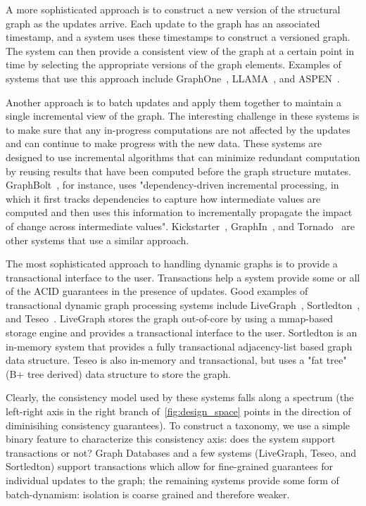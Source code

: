 A more sophisticated approach is to construct a new version of the structural graph as the updates arrive.
Each update to the graph has an associated timestamp, and a system uses these timestamps to construct a versioned graph.
The system can then provide a consistent view of the graph at a certain point in time by selecting the appropriate versions of the graph elements.
Examples of systems that use this approach include GraphOne~\cite{graphone2019kumar}, LLAMA~\cite{llama}, and ASPEN~\cite{10.1145/3314221.3314598}. 

Another approach is to batch updates and apply them together to maintain a single incremental view of the graph.
The interesting challenge in these systems is to make sure that any in-progress computations are not affected by the updates and can continue to make progress with the new data.
These systems are designed to use incremental algorithms that can minimize redundant computation by reusing results that have been computed before the graph structure mutates.
GraphBolt~\cite{mariappan2019graphbolt}, for instance, uses "dependency-driven incremental processing, in which it first tracks dependencies to capture how intermediate values are computed and then uses this information to incrementally propagate the impact of change across intermediate values".
Kickstarter~\cite{vora2017kickstarter}, GraphIn~\cite{sengupta2016graphin}, and Tornado~\cite{shi2016tornado} are other systems that use a similar approach.

The most sophisticated approach to handling dynamic graphs is to provide a transactional interface to the user.
Transactions help a system provide some or all of the ACID guarantees in the presence of updates.
Good examples of transactional dynamic graph processing systems include LiveGraph~\cite{zhu2019livegraph}, Sortledton~\cite{sortledton2022Fuchs}, and Teseo~\cite{teseo2021deLeo}.
LiveGraph stores the graph out-of-core by using a mmap-based storage engine and provides a transactional interface to the user.
Sortledton is an in-memory system that provides a fully transactional adjacency-list based graph data structure.
Teseo is also in-memory and transactional, but uses a "fat tree" (B+ tree derived) data structure to store the graph.

Clearly, the consistency model used by these systems falls along a spectrum (the left-right axis in the right branch of~\autoref{fig:design_space} points in the direction of diminisihing consistency guarantees).
To construct a taxonomy, we use a simple binary feature to characterize this consistency axis: does the system support transactions or not?
Graph Databases and a few systems (LiveGraph, Teseo, and Sortledton) support transactions which allow for fine-grained guarantees for individual updates to the graph; the remaining systems provide some form of batch-dynamism: isolation is coarse grained and therefore weaker.

